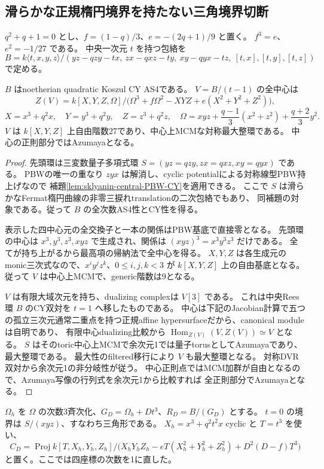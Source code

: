 \subsection{滑らかな正規楕円境界を持たない三角境界切断}
\label{subsec:quantum-triangle}
$q^2+q+1=0$ とし、$f=(1-q)/3$、$e=-(2q+1)/9$ と置く。
$f^3=e$、$e^2=-1/27$ である。
中央一次元 $t$ を持つ包絡を
\[
 B=k\langle t,x,y,z\rangle/
 (yz-qzy-tx,\ zx-qxz-ty,\ xy-qyx-tz,\ [t,x],[t,y],[t,z])
\]
で定める。

\begin{lemma}[包絡と全中心の明示式]
\label{lem:quantum-triangle-centre}
$B$ はnoetherian quadratic Koszul CY AS4である。
$V=B/(t-1)$ の全中心は
\[
 Z(V)=k[X,Y,Z,\Omega]/
 \bigl(\Omega^3+f\Omega^2-XYZ+e(X^2+Y^2+Z^2)\bigr),
\]
\[
 X=x^3+q^2x,\quad Y=y^3+q^2y,\quad Z=z^3+q^2z,\quad
 \Omega=xyz+\frac{q-1}{3}(x^2+z^2)+\frac{q+2}{3}y^2.
\]
$V$ は $k[X,Y,Z]$ 上自由階数27であり、中心上MCMな対称最大整環である。
中心の正則部分ではAzumayaとなる。
\end{lemma}
\begin{proof}
先頭環は三変数量子多項式環
$S=(yz=qzy,zx=qxz,xy=qyx)$ である。
PBWの唯一の重なり $zyx$ は解消し、cyclic potentialによる対称線型PBW持上げなので
補題\ref{lem:sklyanin-central-PBW-CY}を適用できる。
ここで $S$ は滑らかなFermat楕円曲線の非零三捩れtranslationの二次包絡でもあり、
同補題の対象である。従って $B$ の全次数AS4性とCY性を得る。

表示した四中心元の全交換子と一本の関係はPBW基底で直接零となる。
先頭環の中心は $x^3,y^3,z^3,xyz$ で生成され、関係は $(xyz)^3=x^3y^3z^3$ だけである。
全てが持ち上がるから最高項の帰納法で全中心を得る。
$X,Y,Z$ は各生成元のmonic三次式なので、$x^iy^jz^k$、$0\le i,j,k<3$ が
$k[X,Y,Z]$ 上の自由基底となる。
従って $V$ は中心上MCMで、generic階数は9となる。

$V$ は有限大域次元を持ち、dualizing complexは $V[3]$ である。
これは中央Rees環 $B$ のCY双対を $t=1$ へ移したものである。
中心は下記のJacobian計算で五つの孤立三次元通常二重点を持つ正規affine hypersurfaceだから、canonical moduleは自明であり、
有限中心dualizing比較から $\operatorname{Hom}_{Z(V)}(V,Z(V))\simeq V$ となる。
$S$ はそのtoric中心上MCMで余次元1では量子torusとしてAzumayaであり、最大整環である。
最大性のfiltered移行により $V$ も最大整環となる。
対称DVR双対から余次元1の非分岐性が従う。
中心正則点ではMCM加群が自由となるので、Azumaya写像の行列式を余次元1から比較すれば
全正則部分でAzumayaとなる。
\end{proof}

$\Omega_h$ を $\Omega$ の次数3斉次化、$G_D=\Omega_h+Dt^3$、$R_D=B/(G_D)$ とする。
$t=0$ の境界は $S/(xyz)$、すなわち三角形である。
$X_h=x^3+q^2t^2x$ cyclic と $T=t^3$ を使い、
\[
 C_D=\operatorname{Proj}
 k[T,X_h,Y_h,Z_h]/
 \bigl(X_hY_hZ_h-eT(X_h^2+Y_h^2+Z_h^2)+D^2(D-f)T^3\bigr)
\]
と置く。ここでは四座標の次数を1に直した。

